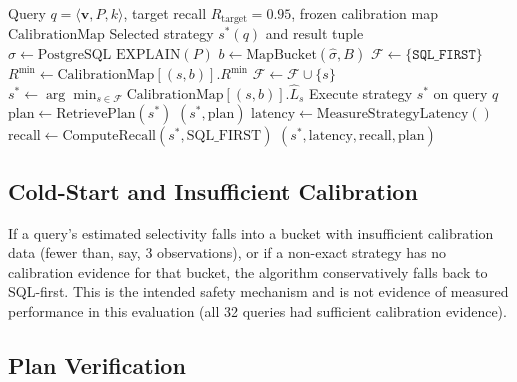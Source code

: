 \documentclass[10pt,twocolumn]{article}
\newcommand{\textproof}[1]{\text{#1}}
\begin{document}
\begin{algorithm}
\caption{Conservative Selectivity-Driven Strategy Selection}
\label{alg:selection}
\begin{algorithmic}[1]
\Require Query $q = \langle \mathbf{v}, P, k \rangle$, target recall $R_{\text{target}} = 0.95$, frozen calibration map $\text{CalibrationMap}$
\Ensure Selected strategy $s^*(q)$ and result tuple
\State $\hat{\sigma} \gets \text{PostgreSQL EXPLAIN}(P)$ 
\State $b \gets \text{MapBucket}(\hat{\sigma}, B)$ 
\State $\mathcal{F} \gets \{ \texttt{SQL\_FIRST} \}$ 
    \State $R^{\min} \gets \text{CalibrationMap}[(s, b)].R^{\min}$
      \State $\mathcal{F} \gets \mathcal{F} \cup \{s\}$ 
    \EndIf
  \EndIf
\EndFor
\State $s^* \gets \arg\min_{s \in \mathcal{F}} \text{CalibrationMap}[(s, b)].\widehat{L}_s$ 
\State Execute strategy $s^*$ on query $q$ 
\State $\text{plan} \gets \text{RetrievePlan}(s^*)$ 
  \State \textproof{Verify}$(s^*, \text{plan})$ 
\EndIf
\State $\text{latency} \gets \text{MeasureStrategyLatency}()$
\State $\text{recall} \gets \text{ComputeRecall}(s^*, \text{SQL\_FIRST})$
\State \Return $(s^*, \text{latency}, \text{recall}, \text{plan})$
\end{algorithmic}
\end{algorithm}

\subsection{Cold-Start and Insufficient Calibration}

If a query's estimated selectivity falls into a bucket with insufficient calibration data (fewer than, say, 3 observations), or if a non-exact strategy has no calibration evidence for that bucket, the algorithm conservatively falls back to SQL-first. This is the intended safety mechanism and is not evidence of measured performance in this evaluation (all 32 queries had sufficient calibration evidence).

\subsection{Plan Verification}
\end{document}
